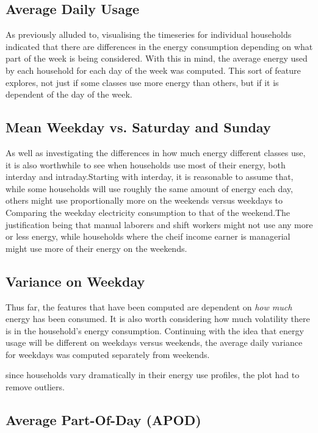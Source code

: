 \subsection*{Average Daily Usage}
As previously alluded to, visualising the timeseries for individual households indicated that there are differences in the energy consumption depending on what part of the week is being considered. With this in mind, the average energy used by each household for each day of the week was computed. This sort of feature explores, not just if some classes use more energy than others, but if it is dependent of the day of the week. 
\averageDayChild
\averageDaySocio

\subsection*{Mean Weekday vs. Saturday and Sunday}
As well as investigating the differences in how much energy different classes use, it is also worthwhile to see when households use most of their energy, both interday and intraday.Starting with interday, it is reasonable to assume that, while some households will use roughly the same amount of energy each day, others might use proportionally more on the weekends versus weekdays  to Comparing the weekday electricity consumption to that of the weekend.The justification being that manual laborers and shift workers  might not use any more or less energy, while households where the cheif income earner is managerial might use more of their energy on the weekends.
\POWrat



\subsection*{Variance on Weekday}
Thus far, the features that have been computed are dependent on \textit{how much} energy has been consumed. It is also worth considering how much volatility there is in the household's energy consumption. Continuing with the idea that energy usage will be different on weekdays versus weekends, the average daily variance for weekdays was computed separately from weekends.

since households vary dramatically in their energy use profiles, the plot had to remove outliers.
\ADVChild
\ADVSocio

\subsection*{Average Part-Of-Day (APOD)}

